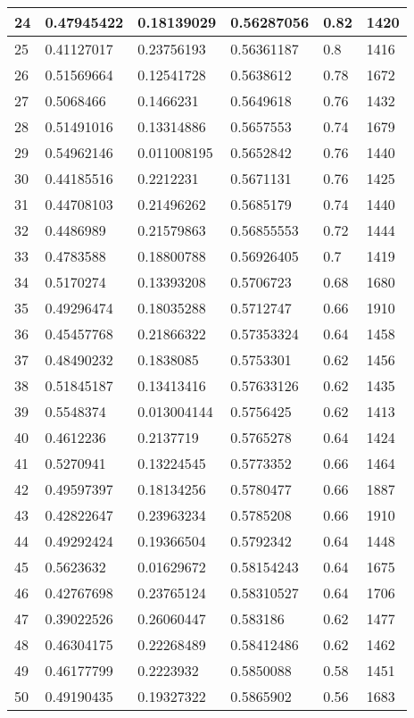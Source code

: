 \begin{longtable}{|l|l|l|l|l|l|}
24 & 0.47945422 & 0.18139029 & 0.56287056 & 0.82 & 1420 \\ \hline 
25 & 0.41127017 & 0.23756193 & 0.56361187 & 0.8 & 1416 \\ \hline 
26 & 0.51569664 & 0.12541728 & 0.5638612 & 0.78 & 1672 \\ \hline 
27 & 0.5068466 & 0.1466231 & 0.5649618 & 0.76 & 1432 \\ \hline 
28 & 0.51491016 & 0.13314886 & 0.5657553 & 0.74 & 1679 \\ \hline 
29 & 0.54962146 & 0.011008195 & 0.5652842 & 0.76 & 1440 \\ \hline 
30 & 0.44185516 & 0.2212231 & 0.5671131 & 0.76 & 1425 \\ \hline 
31 & 0.44708103 & 0.21496262 & 0.5685179 & 0.74 & 1440 \\ \hline 
32 & 0.4486989 & 0.21579863 & 0.56855553 & 0.72 & 1444 \\ \hline 
33 & 0.4783588 & 0.18800788 & 0.56926405 & 0.7 & 1419 \\ \hline 
34 & 0.5170274 & 0.13393208 & 0.5706723 & 0.68 & 1680 \\ \hline 
35 & 0.49296474 & 0.18035288 & 0.5712747 & 0.66 & 1910 \\ \hline 
36 & 0.45457768 & 0.21866322 & 0.57353324 & 0.64 & 1458 \\ \hline 
37 & 0.48490232 & 0.1838085 & 0.5753301 & 0.62 & 1456 \\ \hline 
38 & 0.51845187 & 0.13413416 & 0.57633126 & 0.62 & 1435 \\ \hline 
39 & 0.5548374 & 0.013004144 & 0.5756425 & 0.62 & 1413 \\ \hline 
40 & 0.4612236 & 0.2137719 & 0.5765278 & 0.64 & 1424 \\ \hline 
41 & 0.5270941 & 0.13224545 & 0.5773352 & 0.66 & 1464 \\ \hline 
42 & 0.49597397 & 0.18134256 & 0.5780477 & 0.66 & 1887 \\ \hline 
43 & 0.42822647 & 0.23963234 & 0.5785208 & 0.66 & 1910 \\ \hline 
44 & 0.49292424 & 0.19366504 & 0.5792342 & 0.64 & 1448 \\ \hline 
45 & 0.5623632 & 0.01629672 & 0.58154243 & 0.64 & 1675 \\ \hline 
46 & 0.42767698 & 0.23765124 & 0.58310527 & 0.64 & 1706 \\ \hline 
47 & 0.39022526 & 0.26060447 & 0.583186 & 0.62 & 1477 \\ \hline 
48 & 0.46304175 & 0.22268489 & 0.58412486 & 0.62 & 1462 \\ \hline 
49 & 0.46177799 & 0.2223932 & 0.5850088 & 0.58 & 1451 \\ \hline 
50 & 0.49190435 & 0.19327322 & 0.5865902 & 0.56 & 1683 \\ \hline 
\end{longtable}